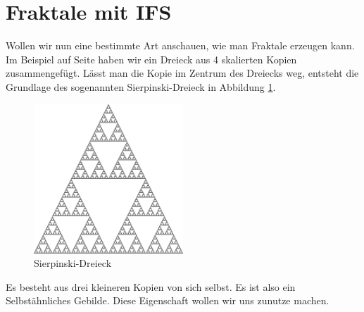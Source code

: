 %
%
%
\section{Fraktale mit IFS 
\label{ifs:section:teil2}}
Wollen wir nun eine bestimmte Art anschauen, wie man Fraktale erzeugen kann.
Im Beispiel auf Seite \pageref{ifs:trinagle} haben wir ein Dreieck aus 4 skalierten Kopien zusammengefügt.
Lässt man die Kopie im Zentrum des Dreiecks weg, entsteht die Grundlage des sogenannten Sierpinski-Dreieck in Abbildung \ref{ifs:sierpinski10}.
\begin{figure}
	\centering
	\includegraphics[width=0.5\textwidth]{papers/ifs/images/sierpinski}
	\caption{Sierpinski-Dreieck}
	\label{ifs:sierpinski10}
\end{figure}
Es besteht aus drei kleineren Kopien von sich selbst.
Es ist also ein Selbstähnliches Gebilde.
Diese Eigenschaft wollen wir uns zunutze machen.


